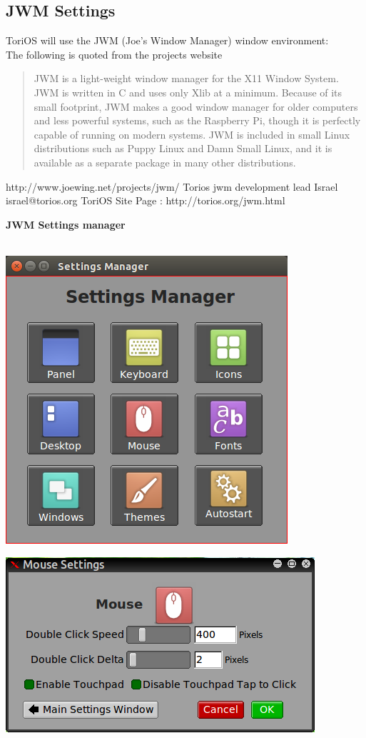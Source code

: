 \documentclass[12pt,a4paper]{book}
\begin{document}
\subsection{JWM Settings}
ToriOS will use the JWM (Joe's Window Manager) window environment:\\

The following is quoted from the projects website

\begin{quote}
JWM is a light-weight window manager for the X11 Window System. JWM is written in C and uses only Xlib at a minimum. Because of its small footprint, JWM makes a good window manager for older computers and less powerful systems, such as the Raspberry Pi, though it is perfectly capable of running on modern systems. JWM is included in small Linux distributions such as Puppy Linux and Damn Small Linux, and it is available as a separate package in many other distributions. 
\end{quote}
http://www.joewing.net/projects/jwm/
Torios jwm development lead Israel israel@torios.org
ToriOS Site Page : http://torios.org/jwm.html
\newpage

{\large \textbf{JWM Settings manager}} \\ \\


\begin{center}
\includegraphics[width=0.7\linewidth]{screen-shots/jwmsettingsmanager}
\end{center}

\begin{center}
\includegraphics[width=0.7\linewidth]{screen-shots/mouse-settings}
\end{center}
\end{document}
